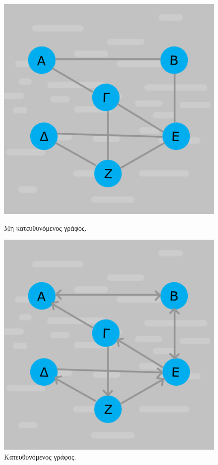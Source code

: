 \begin{figure}[ht]
    \begin{minipage}[c]{.46\linewidth}
        \centering
        \includegraphics[scale=0.15]{2947_thesis/pictures/undirected.png}
        \caption{Μη κατευθυνόμενος γράφος.}
        \label{5}
    \end{minipage}
    \hfill%
    \begin{minipage}[c]{.46\linewidth}
        \centering
        \includegraphics[scale=0.15]{2947_thesis/pictures/directed.png} 
        \caption{Κατευθυνόμενος γράφος.}
        \label{6}
    \end{minipage}
\end{figure}

